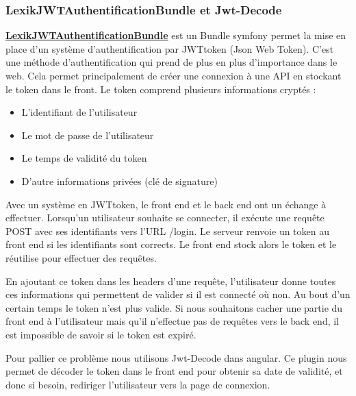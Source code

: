 \documentclass[12pt, twoside, openright]{report}
\begin{document}
\subsubsection{LexikJWTAuthentificationBundle et Jwt-Decode}

\href{https://github.com/lexik/LexikJWTAuthenticationBundle}{\textbf{LexikJWTAuthentificationBundle}} est un Bundle symfony permet la mise en place d'un système d'authentification par JWTtoken (Json Web Token). C'est une méthode d'authentification qui prend de plus en plus d'importance dans le web. Cela permet principalement de créer une connexion à une API en stockant le token dans le front. Le token comprend plusieurs informations cryptés :

\begin{itemize}
\item L'identifiant de l'utilisateur
\item Le mot de passe de l'utilisateur
\item Le temps de validité du token
\item D'autre informations privées (clé de signature)
\end{itemize}

Avec un système en JWTtoken, le front end et le back end ont un échange à effectuer. Lorsqu'un utilisateur souhaite se connecter, il exécute une requête POST avec ses identifiants vers l'URL /login. Le serveur renvoie un token au front end si les identifiants sont corrects. Le front end stock alors le token et le réutilise pour effectuer des requêtes. 

En ajoutant ce token dans les headers d'une requête, l'utilisateur donne toutes ces informations qui permettent de valider si il est connecté où non. Au bout d'un certain temps le token n'est plus valide. Si nous souhaitons cacher une partie du front end à l'utilisateur mais qu'il n'effectue pas de requêtes vers le back end, il est impossible de savoir si le token est expiré. 

Pour pallier ce problème nous utilisons Jwt-Decode dans angular. Ce plugin nous permet de décoder le token dans le front end pour obtenir sa date de validité, et donc si besoin, rediriger l'utilisateur vers la page de connexion. 
\end{document}
